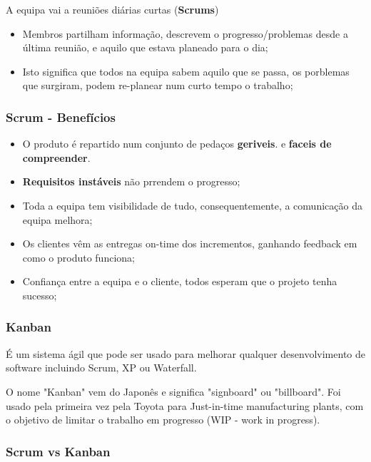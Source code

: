 \documentclass{article}
\begin{document}
A equipa vai a reuniões diárias curtas (\textbf{Scrums})
\begin{itemize}
  \item Membros partilham informação, descrevem o progresso/problemas
  desde a última reunião, e aquilo que estava planeado para o dia;

  \item Isto significa que todos na equipa sabem aquilo que se passa,
  os porblemas que surgiram, podem re-planear num curto tempo o trabalho;
\end{itemize}

\subsubsection{Scrum - Benefícios}

\begin{itemize}
  \item O produto é repartido num conjunto de pedaços \textbf{geriveis}. e \textbf{faceis de compreender}.
  \item \textbf{Requisitos instáveis} não prrendem o progresso;
  \item Toda a equipa tem visibilidade de tudo, consequentemente, a comunicação da equipa melhora;
  \item Os clientes vêm as entregas on-time dos incrementos, ganhando feedback em como o produto funciona;
  \item Confiança entre a equipa e o cliente, todos esperam que o projeto tenha sucesso;
\end{itemize}

\subsubsection{Kanban}

É um sistema ágil que pode ser usado para melhorar qualquer desenvolvimento
de software incluindo Scrum, XP ou Waterfall.

\vspace{2mm}

O nome "Kanban" vem do Japonês e significa "signboard" ou "billboard".
Foi usado pela primeira vez pela Toyota para Just-in-time manufacturing
plants, com o objetivo de limitar o trabalho em progresso (WIP - work in progress).

\subsubsection{Scrum vs Kanban}
\end{document}
